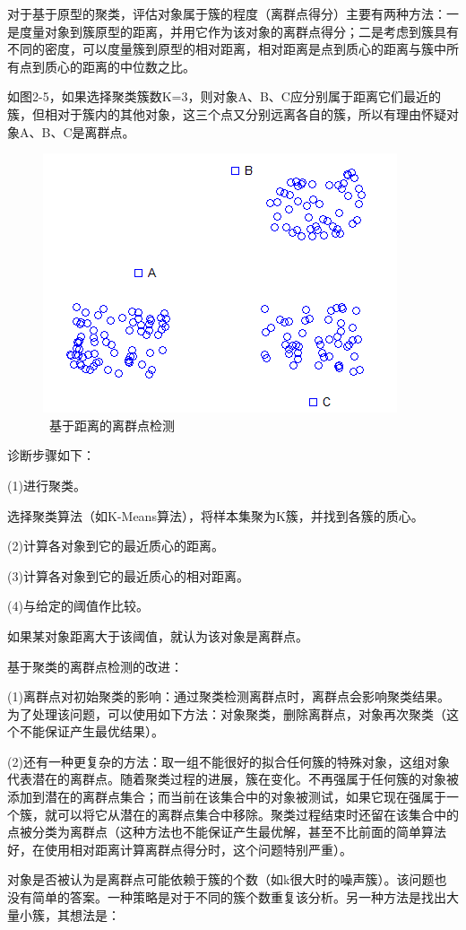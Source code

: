 对于基于原型的聚类，评估对象属于簇的程度（离群点得分）主要有两种方法：一是度量对象到簇原型的距离，并用它作为该对象的离群点得分；二是考虑到簇具有不同的密度，可以度量簇到原型的相对距离，相对距离是点到质心的距离与簇中所有点到质心的距离的中位数之比。

如图2-5，如果选择聚类簇数K=3，则对象A、B、C应分别属于距离它们最近的簇，但相对于簇内的其他对象，这三个点又分别远离各自的簇，所以有理由怀疑对象A、B、C是离群点。


\begin{figure}[thbp!]
\centering
\includegraphics[width=0.4\linewidth]{figure/2-8}
\caption{\ 基于距离的离群点检测}
\label{fig:2-8}
\end{figure}


诊断步骤如下：


(1)进行聚类。

选择聚类算法（如K-Means算法），将样本集聚为K簇，并找到各簇的质心。

(2)计算各对象到它的最近质心的距离。

(3)计算各对象到它的最近质心的相对距离。

(4)与给定的阈值作比较。

如果某对象距离大于该阈值，就认为该对象是离群点。



基于聚类的离群点检测的改进：



(1)离群点对初始聚类的影响：通过聚类检测离群点时，离群点会影响聚类结果。为了处理该问题，可以使用如下方法：对象聚类，删除离群点，对象再次聚类（这个不能保证产生最优结果）。

(2)还有一种更复杂的方法：取一组不能很好的拟合任何簇的特殊对象，这组对象代表潜在的离群点。随着聚类过程的进展，簇在变化。不再强属于任何簇的对象被添加到潜在的离群点集合；而当前在该集合中的对象被测试，如果它现在强属于一个簇，就可以将它从潜在的离群点集合中移除。聚类过程结束时还留在该集合中的点被分类为离群点（这种方法也不能保证产生最优解，甚至不比前面的简单算法好，在使用相对距离计算离群点得分时，这个问题特别严重）。

对象是否被认为是离群点可能依赖于簇的个数（如k很大时的噪声簇）。该问题也没有简单的答案。一种策略是对于不同的簇个数重复该分析。另一种方法是找出大量小簇，其想法是：

